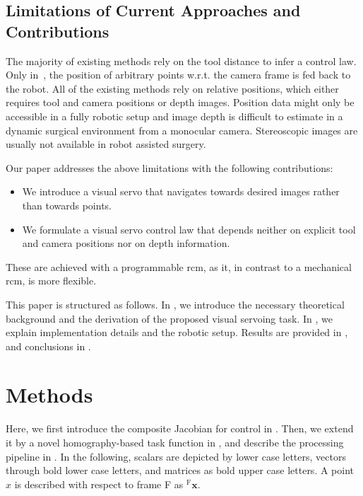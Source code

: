
\subsection{Limitations of Current Approaches and Contributions}
The majority of existing methods rely on the tool distance to infer a control law. Only in~\cite{ma2019autonomous, ma2020visual, aghakhani2013task, yang2019adaptive, li2020accelerated, osa2010framework}, the position of arbitrary points w.r.t. the camera frame is fed back to the robot. All of the existing methods rely on relative positions, which either requires tool and camera positions or depth images. Position data might only be accessible in a fully robotic setup and image depth is difficult to estimate in a dynamic surgical environment from a monocular camera. Stereoscopic images are usually not available in robot assisted surgery.

Our paper addresses the above limitations with the following contributions:
\begin{itemize}
    \item We introduce a visual servo that navigates towards desired images rather than towards points.
    \item We formulate a visual servo control law that depends neither on explicit tool and camera positions nor on depth information.
\end{itemize} 
These are achieved with a programmable \acrshort{rcm}, as it, in contrast to a mechanical \acrshort{rcm}, is more flexible. 

This paper is structured as follows. In , we introduce the necessary theoretical background and the derivation of the proposed visual servoing task. In , we explain implementation details and the robotic setup. Results are provided in , and conclusions in .

\section{Methods}
\label{c2:sec:methods}
Here, we first introduce the composite Jacobian for control in . Then, we extend it by a novel homography-based task function in , and describe the processing pipeline in . In the following, scalars are depicted by lower case letters, vectors through bold lower case letters, and matrices as bold upper case letters. A point $x$ is described with respect to frame F as $^\text{F}\mathbf{x}$.

